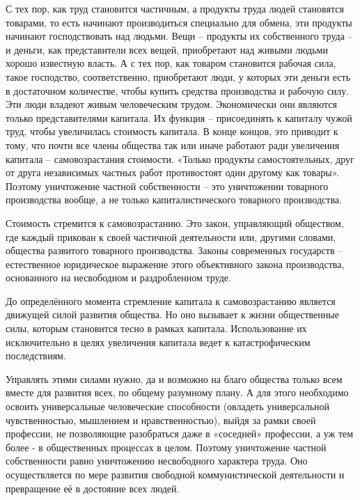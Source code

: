 \documentclass[../main]{subfiles}
\begin{document}
С тех пор, как труд становится частичным, а продукты труда людей становятся товарами, то есть начинают производиться специально для обмена, эти продукты начинают господствовать над людьми. Вещи – продукты их собственного труда – и деньги, как представители всех вещей, приобретают над живыми людьми хорошо известную власть. А с тех пор, как товаром становится рабочая сила, такое господство, соответственно, приобретают люди, у которых эти деньги есть в достаточном количестве, чтобы купить средства производства и рабочую силу. Эти люди владеют живым человеческим трудом. Экономически они являются только представителями капитала. Их функция – присоединять к капиталу чужой труд, чтобы увеличилась стоимость капитала. В конце концов, это приводит к тому, что почти все члены общества так или иначе работают ради увеличения капитала – самовозрастания стоимости. «Только продукты самостоятельных, друг от друга независимых частных работ противостоят один другому как товары». Поэтому уничтожение частной собственности – это уничтожении товарного производства вообще, а не только капиталистического товарного производства.

Стоимость стремится к самовозрастанию. Это закон, управляющий обществом, где каждый прикован к своей частичной деятельности или, другими словами, общества развитого товарного производства. Законы современных государств – естественное юридическое выражение этого объективного закона производства, основанного на несвободном и раздробленном труде.

До определённого момента стремление капитала к самовозрастанию является движущей силой развития общества. Но оно вызывает к жизни общественные силы, которым становится тесно в рамках капитала. Использование их исключительно в целях увеличения капитала ведет к катастрофическим последствиям.

Управлять этими силами нужно, да и возможно на благо общества только всем вместе для развития всех, по общему разумному плану. А для этого необходимо освоить универсальные человеческие способности (овладеть универсальной чувственностью, мышлением и нравственностью), выйдя за рамки своей профессии, не позволяющие разобраться даже в «соседней» профессии, а уж тем более - в общественных процессах в целом. Поэтому уничтожение частной собственности равно уничтожению несвободного характера труда. Оно осуществляется по мере развития свободной коммунистической деятельности и превращение её в достояние всех людей.
\end{document}
